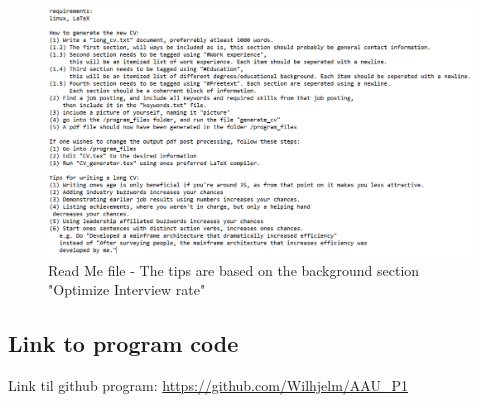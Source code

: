 
\begin{figure}[H]
      \centering
      \includegraphics[scale = 0.7]{figures/readme.png}
      \caption{Read Me file - The tips are based on the background section "Optimize Interview rate"}
\end{figure}


\subsection{Link to program code}
Link til github program: \url{https://github.com/Wilhjelm/AAU_P1}